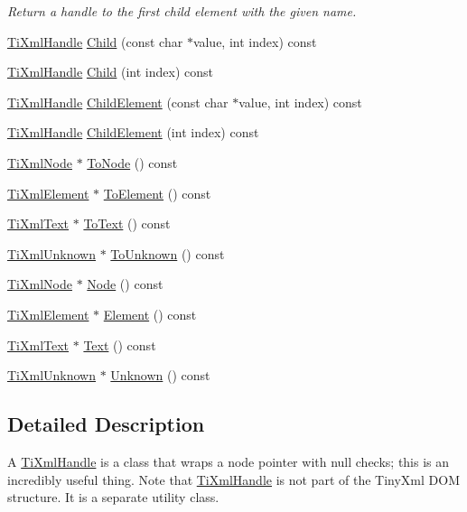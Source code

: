 \begin{DoxyCompactItemize}
\begin{DoxyCompactList}\small\item\em Return a handle to the first child element with the given name. \end{DoxyCompactList}\item 
\hyperlink{classTiXmlHandle}{Ti\-Xml\-Handle} \hyperlink{classTiXmlHandle_a072492b4be1acdb0db2d03cd8f71ccc4}{Child} (const char $\ast$value, int index) const 
\item 
\hyperlink{classTiXmlHandle}{Ti\-Xml\-Handle} \hyperlink{classTiXmlHandle_af9cf6a7d08a5da94a8924425ad0cd5ac}{Child} (int index) const 
\item 
\hyperlink{classTiXmlHandle}{Ti\-Xml\-Handle} \hyperlink{classTiXmlHandle_a979a3f850984a176ee884e394c7eed2d}{Child\-Element} (const char $\ast$value, int index) const 
\item 
\hyperlink{classTiXmlHandle}{Ti\-Xml\-Handle} \hyperlink{classTiXmlHandle_a8786475b9d1f1518492e3a46704c7ef0}{Child\-Element} (int index) const 
\item 
\hyperlink{classTiXmlNode}{Ti\-Xml\-Node} $\ast$ \hyperlink{classTiXmlHandle_af678e5088e83be67baf76f699756f2c3}{To\-Node} () const 
\item 
\hyperlink{classTiXmlElement}{Ti\-Xml\-Element} $\ast$ \hyperlink{classTiXmlHandle_abc6e7ed383a5fe1e52b0c0004b457b9e}{To\-Element} () const 
\item 
\hyperlink{classTiXmlText}{Ti\-Xml\-Text} $\ast$ \hyperlink{classTiXmlHandle_a4ac53a652296203a5b5e13854d923586}{To\-Text} () const 
\item 
\hyperlink{classTiXmlUnknown}{Ti\-Xml\-Unknown} $\ast$ \hyperlink{classTiXmlHandle_a1381c17507a130767b1e23afc93b3674}{To\-Unknown} () const 
\item 
\hyperlink{classTiXmlNode}{Ti\-Xml\-Node} $\ast$ \hyperlink{classTiXmlHandle_ab44b723a8dc9af72838a303c079d0376}{Node} () const 
\item 
\hyperlink{classTiXmlElement}{Ti\-Xml\-Element} $\ast$ \hyperlink{classTiXmlHandle_acb5fe8388a526289ea65e817a51e05e7}{Element} () const 
\item 
\hyperlink{classTiXmlText}{Ti\-Xml\-Text} $\ast$ \hyperlink{classTiXmlHandle_a9fc739c8a18d160006f82572fc143d13}{Text} () const 
\item 
\hyperlink{classTiXmlUnknown}{Ti\-Xml\-Unknown} $\ast$ \hyperlink{classTiXmlHandle_a49675b74357ba2aae124657a9a1ef465}{Unknown} () const 
\end{DoxyCompactItemize}


\subsection{Detailed Description}
A \hyperlink{classTiXmlHandle}{Ti\-Xml\-Handle} is a class that wraps a node pointer with null checks; this is an incredibly useful thing. Note that \hyperlink{classTiXmlHandle}{Ti\-Xml\-Handle} is not part of the Tiny\-Xml D\-O\-M structure. It is a separate utility class.

